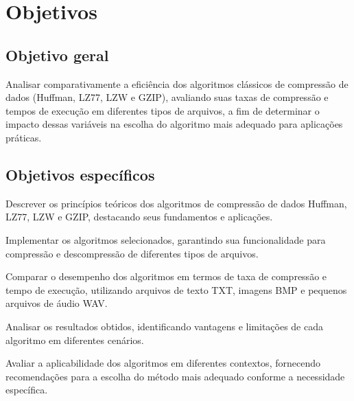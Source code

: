 \chapter{Objetivos}
\label{c.objetivos}

\section{Objetivo geral}

Analisar comparativamente a eficiência dos algoritmos clássicos de compressão de dados (Huffman, LZ77, LZW e GZIP), avaliando suas taxas de compressão e tempos de execução em diferentes tipos de arquivos, a fim de determinar o impacto dessas variáveis na escolha do algoritmo mais adequado para aplicações práticas.

\section{Objetivos específicos}

\begin{alineas}
	\item Descrever os princípios teóricos dos algoritmos de compressão de dados Huffman, LZ77, LZW e GZIP, destacando seus fundamentos e aplicações.
	\item Implementar os algoritmos selecionados, garantindo sua funcionalidade para compressão e descompressão de diferentes tipos de arquivos.
	\item Comparar o desempenho dos algoritmos em termos de taxa de compressão e tempo de execução, utilizando arquivos
    de texto TXT, imagens BMP e pequenos arquivos de áudio WAV.
	\item Analisar os resultados obtidos, identificando vantagens e limitações de cada algoritmo em diferentes cenários.
	\item Avaliar a aplicabilidade dos algoritmos em diferentes contextos, fornecendo recomendações para a escolha do método mais adequado conforme a necessidade específica.
\end{alineas}
